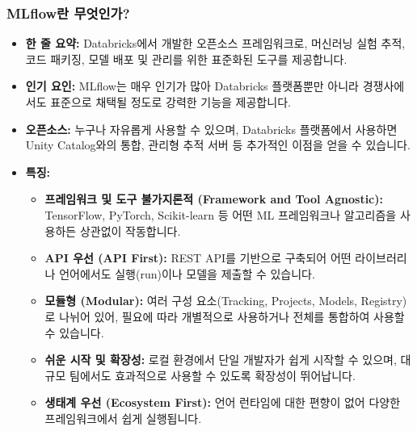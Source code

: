\documentclass[11pt,a4paper]{article}
\begin{document}
\subsubsection*{MLflow란 무엇인가?}
\begin{itemize}
    \item \textbf{한 줄 요약:} Databricks에서 개발한 오픈소스 프레임워크로, 머신러닝 실험 추적, 코드 패키징, 모델 배포 및 관리를 위한 표준화된 도구를 제공합니다.
    \item \textbf{인기 요인:} MLflow는 매우 인기가 많아 Databricks 플랫폼뿐만 아니라 경쟁사에서도 표준으로 채택될 정도로 강력한 기능을 제공합니다.
    \item \textbf{오픈소스:} 누구나 자유롭게 사용할 수 있으며, Databricks 플랫폼에서 사용하면 Unity Catalog와의 통합, 관리형 추적 서버 등 추가적인 이점을 얻을 수 있습니다.
    \item \textbf{특징:}
    \begin{itemize}
        \item \textbf{프레임워크 및 도구 불가지론적 (Framework and Tool Agnostic):} TensorFlow, PyTorch, Scikit-learn 등 어떤 ML 프레임워크나 알고리즘을 사용하든 상관없이 작동합니다.
        \item \textbf{API 우선 (API First):} REST API를 기반으로 구축되어 어떤 라이브러리나 언어에서도 실행(run)이나 모델을 제출할 수 있습니다.
        \item \textbf{모듈형 (Modular):} 여러 구성 요소(Tracking, Projects, Models, Registry)로 나뉘어 있어, 필요에 따라 개별적으로 사용하거나 전체를 통합하여 사용할 수 있습니다.
        \item \textbf{쉬운 시작 및 확장성:} 로컬 환경에서 단일 개발자가 쉽게 시작할 수 있으며, 대규모 팀에서도 효과적으로 사용할 수 있도록 확장성이 뛰어납니다.
        \item \textbf{생태계 우선 (Ecosystem First):} 언어 런타임에 대한 편향이 없어 다양한 프레임워크에서 쉽게 실행됩니다.
    \end{itemize}
\end{itemize}
\end{document}
